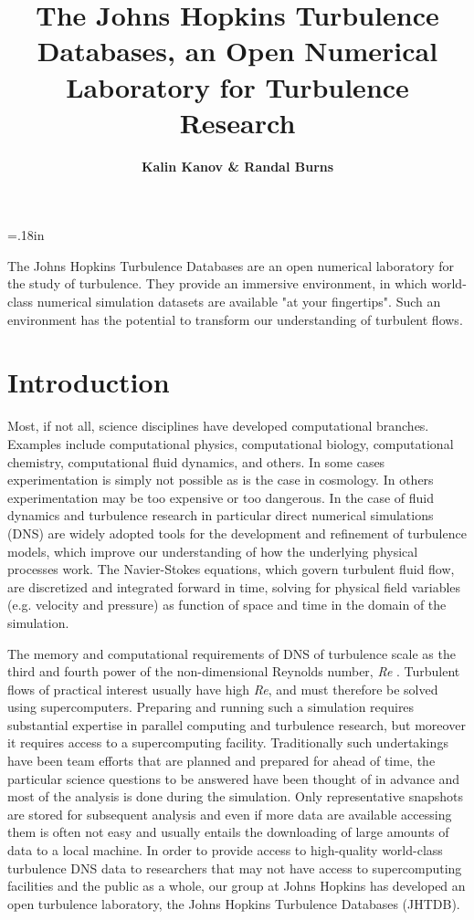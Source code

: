 \documentclass[10pt,twocolumn]{article}
\begin{document}
\title{\Large \bf \color{bl} The Johns Hopkins Turbulence Databases, an Open Numerical Laboratory for Turbulence Research} 
\author{\bf Kalin Kanov \& Randal Burns} 
\baselineskip=.18in
  
\twocolumn[\maketitle]

\setcounter{page}{1}

The Johns Hopkins Turbulence Databases are an open numerical laboratory for the study of turbulence. They provide an immersive environment, in which
world-class numerical simulation datasets are available "at your fingertips". Such an environment has the potential to transform our understanding of
turbulent flows.

 
\vspace{-0.2in}
\section{Introduction}
\label{sec-introduction}
\vspace{-0.15in}

Most, if not all, science disciplines have developed computational branches. Examples include computational physics, computational biology,
computational chemistry, computational fluid dynamics, and others. In some cases experimentation is simply not possible as is the case in cosmology.
In others experimentation may be too expensive or too dangerous. In the case of fluid dynamics and turbulence research in particular direct numerical
simulations (DNS) are widely adopted tools for the development and refinement of turbulence models, which improve our understanding of how the
underlying physical processes work. The Navier-Stokes equations, which govern
turbulent fluid flow, are discretized and integrated forward in time, solving for physical field variables (e.g. velocity and pressure) as function of space 
and time in the domain of the simulation. 

The memory and computational requirements of DNS of turbulence scale as the third and fourth power of the
non-dimensional Reynolds number, \emph{Re} \cite{Lee}. Turbulent flows of practical interest usually have high
\emph{Re}, and must therefore be solved using supercomputers. Preparing and running such a simulation requires substantial expertise in parallel
computing and turbulence research, but moreover it requires access to a supercomputing facility. Traditionally such undertakings have been team 
efforts that are planned and prepared for ahead of time, the particular science questions to be answered have been thought of in advance and most of the
analysis is done during the simulation. Only representative snapshots are stored for subsequent analysis and even if more data are available accessing
them is often not easy and usually entails the downloading of large amounts of data to a local machine. In order to provide access to high-quality
world-class turbulence DNS data to researchers that may not have access to supercomputing facilities and the public as a whole, our group at Johns 
Hopkins has developed an open turbulence laboratory, the Johns Hopkins Turbulence Databases (JHTDB). 
\end{document}
